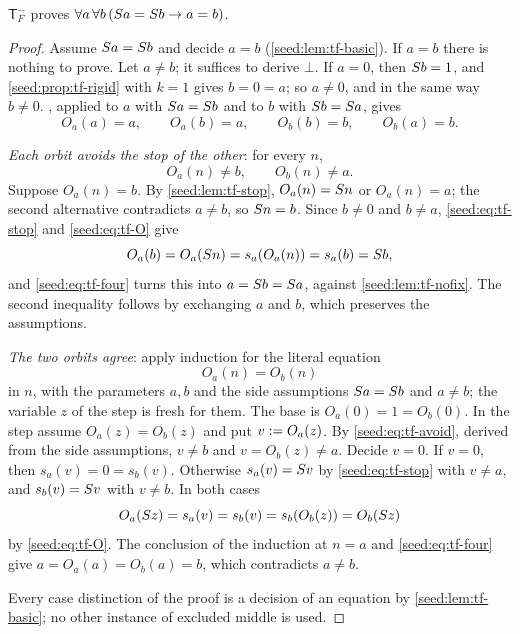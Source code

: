 \begin{theorem}\label{seed:thm:tf-inj}
$\mathsf{T}_F^{-}$ proves $\forall a\,\forall b\,(S a=S b\to a=b)$.
\end{theorem}

\begin{proof}
Assume $S a=S b$ and decide $a=b$ (\cref{seed:lem:tf-basic}). If
$a=b$ there is nothing to prove. Let $a\neq b$; it suffices to derive $\bot$.
If $a=0$, then $S b=1$, and \cref{seed:prop:tf-rigid} with $k=1$ gives
$b=0=a$; so $a\neq0$, and in the same way $b\neq0$. ,
applied to $a$ with $S a=S b$ and to $b$ with $S b=S a$, gives
\begin{equation}\label{seed:eq:tf-four}
 O_a(a)=a,\qquad O_a(b)=a,\qquad O_b(b)=b,\qquad O_b(a)=b.
\end{equation}

\emph{Each orbit avoids the stop of the other}: for every $n$,
\begin{equation}\label{seed:eq:tf-avoid}
 O_a(n)\neq b,\qquad O_b(n)\neq a.
\end{equation}
Suppose $O_a(n)=b$. By \cref{seed:lem:tf-stop}, $O_a(n)=S n$ or
$O_a(n)=a$; the second alternative contradicts $a\neq b$, so $S n=b$.
Since $b\neq0$ and $b\neq a$, \eqref{seed:eq:tf-stop} and
\eqref{seed:eq:tf-O} give
\[
 O_a(b)=O_a(S n)=s_a(O_a(n))=s_a(b)=S b,
\]
and \eqref{seed:eq:tf-four} turns this into $a=S b=S a$, against
\cref{seed:lem:tf-nofix}. The second inequality follows by exchanging $a$ and
$b$, which preserves the assumptions.

\emph{The two orbits agree}: apply induction for the literal equation
\[
 O_a(n)=O_b(n)
\]
in $n$, with the parameters $a,b$ and the side assumptions $S a=S b$ and
$a\neq b$; the variable $z$ of the step is fresh for them. The base is
$O_a(0)=1=O_b(0)$. In the step assume $O_a(z)=O_b(z)$ and put
$v\mathrel{:=} O_a(z)$. By \eqref{seed:eq:tf-avoid}, derived from the side
assumptions, $v\neq b$ and $v=O_b(z)\neq a$. Decide $v=0$. If $v=0$, then
$s_a(v)=0=s_b(v)$. Otherwise $s_a(v)=S v$ by \eqref{seed:eq:tf-stop} with
$v\neq a$, and $s_b(v)=S v$ with $v\neq b$. In both cases
\[
 O_a(S z)=s_a(v)=s_b(v)=s_b(O_b(z))=O_b(S z)
\]
by \eqref{seed:eq:tf-O}. The conclusion of the induction at $n=a$ and
\eqref{seed:eq:tf-four} give $a=O_a(a)=O_b(a)=b$, which contradicts $a\neq b$.

Every case distinction of the proof is a decision of an equation by
\cref{seed:lem:tf-basic}; no other instance of excluded middle is used.
\end{proof}

